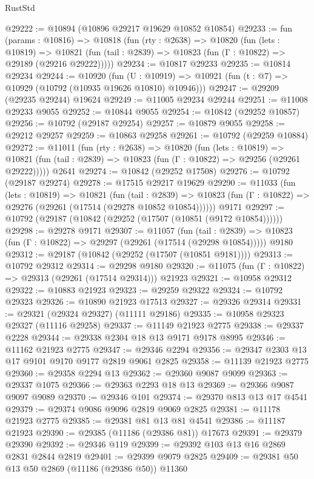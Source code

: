 \begin{lexlean}{RustStd}
\begin{coremodule}
@29222 := @10894 (@10896 @29217 @19629 @10852 @10854)
@29233 := fun (params : @10816) =>
  @10818
    (fun (rty : @2638) =>
    @10820
      (fun (lets : @10819) =>
      @10821 (fun (tail : @2839) => @10823 (fun (Γ : @10822) => @29189 (@29216 @29222)))))
@29234 := @10817 @29233
@29235 := @10814 @29234
@29244 := @10920
    (fun (U : @10919) => @10921 (fun (t : @7) => @10929 (@10792 (@10935 @19626 @10810) @10946)))
@29247 := @29209 (@29235 @29244) @19624
@29249 := @11005 @29234 @29244
@29251 := @11008 @29233 @9055
@29252 := @10844 @9055
@29254 := @10842 (@29252 @10857)
@29256 := @10792 (@29187 @29254)
@29257 := @10879 @9055
@29258 := @29212 @29257
@29259 := @10863 @29258
@29261 := @10792 (@29259 @10884)
@29272 := @11011
    (fun (rty : @2638) =>
    @10820
      (fun (lets : @10819) =>
      @10821 (fun (tail : @2839) => @10823 (fun (Γ : @10822) => @29256 (@29261 @29222)))))
    @2641
@29274 := @10842 (@29252 @17508)
@29276 := @10792 (@29187 @29274)
@29278 := @17515 @29217 @19629
@29290 := @11033
    (fun (lets : @10819) =>
    @10821
      (fun (tail : @2839) =>
      @10823 (fun (Γ : @10822) => @29276 (@29261 (@17514 (@29278 @10852 @10854))))))
    @9171
@29297 := @10792 (@29187 (@10842 (@29252 (@17507 (@10851 (@9172 @10854))))))
@29298 := @29278 @9171
@29307 := @11057
    (fun (tail : @2839) => @10823 (fun (Γ : @10822) => @29297 (@29261 (@17514 (@29298 @10854)))))
    @9180
@29312 := @29187 (@10842 (@29252 (@17507 (@10851 @9181))))
@29313 := @10792 @29312
@29314 := @29298 @9180
@29320 := @11075 (fun (Γ : @10822) => @29313 (@29261 (@17514 @29314))) @21923
@29321 := @10958 @29312
@29322 := @10883 @21923
@29323 := @29259 @29322
@29324 := @10792 @29323
@29326 := @10890 @21923 @17513
@29327 := @29326 @29314
@29331 := @29321 (@29324 @29327) (@11111 @29186)
@29335 := @10958 @29323 @29327 (@11116 @29258)
@29337 := @11149 @21923 @2775
@29338 := @29337 @2228
@29344 := @29338 @2304 @18 @13 @9171 @9178 @8995
@29346 := @11162 @21923 @2775
@29347 := @29346 @2294
@29356 := @29347 @2303 @13 @17 @9101 @9170 @9177 @2819 @9061 @2825
@29358 := @11139 @21923 @2775
@29360 := @29358 @2294 @13
@29362 := @29360 @9087 @9099
@29363 := @29337 @1075
@29366 := @29363 @2293 @18 @13
@29369 := @29366 @9087 @9097 @9089
@29370 := @29346 @101
@29374 := @29370 @813 @13 @17 @4541
@29379 := @29374 @9086 @9096 @2819 @9069 @2825
@29381 := @11178 @21923 @2775
@29385 := @29381 @81 @13 @81 @4541
@29386 := @11187 @21923
@29390 := @29385 (@11186 (@29386 @81)) @17673
@29391 := @29379 @29390
@29392 := @29346 @119
@29399 := @29392 @103 @13 @16 @2869 @2831 @2844 @2819
@29401 := @29399 @9079 @2825
@29409 := @29381 @50 @13 @50 @2869 (@11186 (@29386 @50)) @11360

\end{coremodule}
\end{lexlean}
